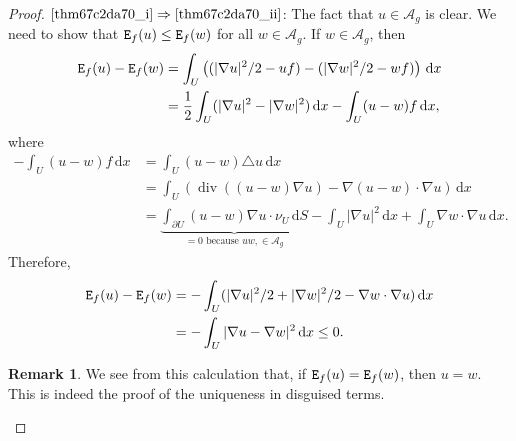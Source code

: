 \documentclass[a4paper,9pt]{amsart}
\newcommand{\scr}[1]{\mathscr{#1}}
\newcommand{\did}{\,\mathrm{d}}	%
\newcommand{\de}{\partial}		%
\renewcommand{\div}{\operatorname{div}}	%
\newcommand{\THEN}{\Rightarrow}	%
\newcommand{\laplacian}{\triangle}
\newcommand{\grad}{\nabla}
\theoremstyle{plain}
\theoremstyle{definition}
\newtheorem{remark}[proposition]{Remark}
\theoremstyle{remark}
\begin{document}
\begin{proof}
	$\ref{thm67c2da70_i}\THEN\ref{thm67c2da70_ii}$:
	The fact that $u\in\scr A_g$ is clear. 
	We need to show that $\mathtt{E}_f(u) \le \mathtt{E}_f(w)$ for all $w\in \scr A_g$.
	If $w\in \scr A_g$, then
	\begin{align*}
	 	\dirichletE_f(u) - \dirichletE_f(w)
		&= \int_U \left( (|\grad u|^2/2 - uf ) - ( |\grad w|^2/2 - wf ) \right) \did x \\
		&= \frac12 \int_U (|\grad u|^2 - |\grad w|^2) \did x
			- \int_U (u-w) f \did x ,
	\end{align*}
	where
	\begin{align*}
	 	-\int_U (u-w) f \did x
		&= \int_U (u-w) \laplacian u \did x \\
		&= \int_U (\div((u-w)\grad u) - \grad(u-w) \cdot \grad u) \did x \\
		&= \underbrace{\int_{\de U} (u-w) \grad u \cdot \nu_U \did S }_{ =0 \text{ because }uw,\in\scr A_g}
			- \int_U |\grad u|^2 \did x 
			+ \int_U \grad w \cdot\grad u \did x .
	\end{align*}
	Therefore,
	\begin{align*}
	 	\dirichletE_f(u) - \dirichletE_f(w)
		&= - \int_U ( |\grad u|^2/2 + |\grad w|^2/2 - \grad w\cdot \grad u ) \did x \\
		&= - \int_U |\grad u-\grad w|^2 \did x 
		\le 0 .
	\end{align*}
	
	\begin{remark}
		We see from this calculation that, if $\mathtt{E}_f(u) = \mathtt{E}_f(w)$,
		then $u=w$.
		This is indeed the proof of the uniqueness in disguised terms.
	\end{remark}
	

\end{proof}
\end{document}
